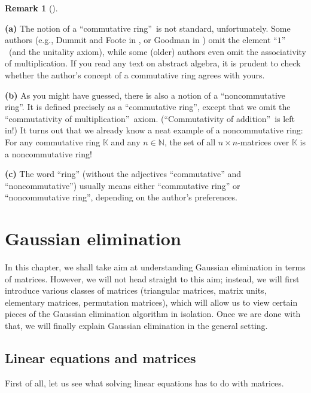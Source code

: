 \documentclass[numbers=enddot,12pt,final,onecolumn,notitlepage]{scrartcl}%
\theoremstyle{definition}
\newtheorem{remk}[theo]{Remark}
\newenvironment{remark}[1][]
{\begin{remk}[#1]\begin{leftbar}}
{\end{leftbar}\end{remk}}
\begin{document}
\begin{remark}
\textbf{(a)} The notion of a \textquotedblleft commutative
ring\textquotedblright\ is not standard, unfortunately. Some authors (e.g.,
Dummit and Foote in \cite[Part II]{DumFoo04}, or Goodman in \cite[Chapters 1
and 6]{Goodma15}) omit the element \textquotedblleft$1$\textquotedblright%
\ (and the unitality axiom), while some (older) authors even omit the
associativity of multiplication. If you read any text on abstract algebra, it
is prudent to check whether the author's concept of a commutative ring agrees
with yours.

\textbf{(b)} As you might have guessed, there is also a notion of a
\textquotedblleft noncommutative ring\textquotedblright. It is defined
precisely as a \textquotedblleft commutative ring\textquotedblright, except
that we omit the \textquotedblleft commutativity of
multiplication\textquotedblright\ axiom. (\textquotedblleft Commutativity of
addition\textquotedblright\ is left in!) It turns out that we already know a
neat example of a noncommutative ring: For any commutative ring $\mathbb{K}$
and any $n\in\mathbb{N}$, the set of all $n\times n$-matrices over
$\mathbb{K}$ is a noncommutative ring!

\textbf{(c)} The word ``ring'' (without the adjectives ``commutative'' and
``noncommutative'') usually means either ``commutative ring'' or
``noncommutative ring'', depending on the author's preferences.
\end{remark}

\section{Gaussian elimination}

In this chapter, we shall take aim at understanding Gaussian elimination in
terms of matrices. However, we will not head straight to this aim; instead, we
will first introduce various classes of matrices (triangular matrices, matrix
units, elementary matrices, permutation matrices), which will allow us to view
certain pieces of the Gaussian elimination algorithm in isolation. Once we are
done with that, we will finally explain Gaussian elimination in the general setting.

\subsection{Linear equations and matrices}

First of all, let us see what solving linear equations has to do with matrices.
\end{document}
